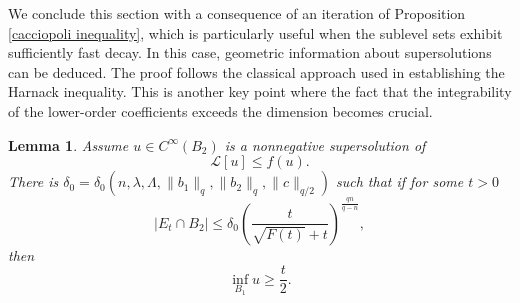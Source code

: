 \documentclass[12pt,a4paper]{amsart}
\numberwithin{equation}{section} %
\newtheorem{lemma}[theorem]{Lemma}
\theoremstyle{definition}
\theoremstyle{remark}
\begin{document}
We conclude this section with a consequence of an iteration of Proposition \ref{cacciopoli inequality}, which is particularly useful when the sublevel sets exhibit sufficiently fast decay. In this case, geometric information about supersolutions can be deduced. The proof follows the classical approach used in establishing the Harnack inequality. This is another key point where the fact that the integrability of the lower-order coefficients exceeds the dimension becomes crucial.

\begin{lemma}\label{sublevel measure decay}
Assume $u \in C^\infty(B_2)$ is a nonnegative supersolution of
$$
    \mathcal{L}[u] \leq f(u).
$$
There is $\delta_0 = \delta_0(n,\lambda,\Lambda,\|b_1\|_{q},\|b_2\|_{q},\|c\|_{q/2})$  such that if for some $t >0$ 
$$
    |E_t \cap B_2| \leq \delta_0 \left(\frac{t}{\sqrt{F(t)} + t} \right)^\frac{q n}{q-n},
$$
then
$$
    \inf_{B_1} u \geq \frac{t}{2}.
$$
\end{lemma}
\end{document}
